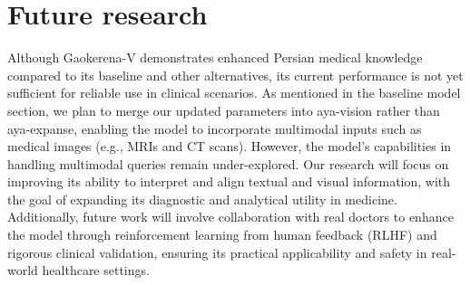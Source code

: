\documentclass[conference]{IEEEtran}
\begin{document}
	\section*{Future research}
	Although Gaokerena-V demonstrates enhanced Persian medical knowledge compared to its baseline and other alternatives, its current performance is not yet sufficient for reliable use in clinical scenarios. As mentioned in the baseline model section, we plan to merge our updated    parameters into aya-vision rather than aya-expanse, enabling the model to incorporate multimodal inputs such as medical images (e.g., MRIs and CT scans). However, the model’s capabilities in handling multimodal queries remain under-explored. Our research will focus on improving its ability to interpret and align textual and visual information, with the goal of expanding its diagnostic and analytical utility in medicine. Additionally, future work will involve collaboration with real doctors to enhance the model through reinforcement learning from human feedback (RLHF)
\cite{b36} and rigorous clinical validation, ensuring its practical applicability and safety in real-world healthcare settings.
	
\end{document}
